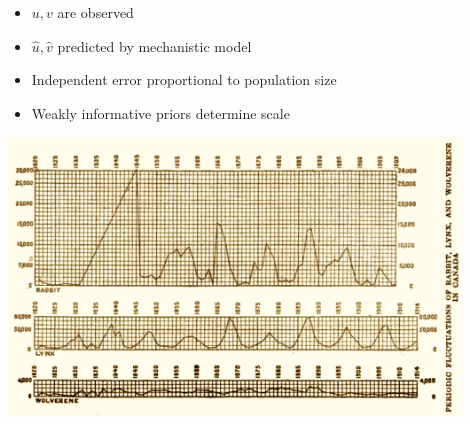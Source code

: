 \documentclass[10pt]{report}
\begin{document}
\begin{itemize}
\item $u, v$ are observed
\item $\hat{u}, \hat{v}$ predicted by mechanistic model
\item Independent error proportional to population size
\item Weakly informative priors determine scale
\end{itemize}

\begin{center}
\includegraphics[width=0.9\textwidth]{img/hudons-bay-data.png}
\end{center}
\end{document}
